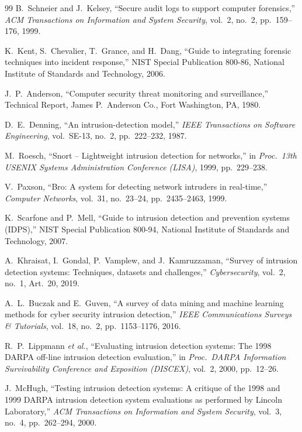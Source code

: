 \documentclass[12pt,a4paper,oneside]{article}
\begin{document}
\begin{thebibliography}{99}
 B.~Schneier and J.~Kelsey, ``Secure audit logs to support computer forensics,'' \emph{ACM Transactions on Information and System Security}, vol.~2, no.~2, pp.\ 159--176, 1999.

 K.~Kent, S.~Chevalier, T.~Grance, and H.~Dang, ``Guide to integrating forensic techniques into incident response,'' NIST Special Publication 800-86, National Institute of Standards and Technology, 2006.

 J.~P.~Anderson, ``Computer security threat monitoring and surveillance,'' Technical Report, James P.\ Anderson Co., Fort Washington, PA, 1980.

 D.~E.~Denning, ``An intrusion-detection model,'' \emph{IEEE Transactions on Software Engineering}, vol.~SE-13, no.~2, pp.\ 222--232, 1987.

 M.~Roesch, ``Snort -- Lightweight intrusion detection for networks,'' in \emph{Proc.\ 13th USENIX Systems Administration Conference (LISA)}, 1999, pp.\ 229--238.

 V.~Paxson, ``Bro: A system for detecting network intruders in real-time,'' \emph{Computer Networks}, vol.~31, no.~23--24, pp.\ 2435--2463, 1999.

 K.~Scarfone and P.~Mell, ``Guide to intrusion detection and prevention systems (IDPS),'' NIST Special Publication 800-94, National Institute of Standards and Technology, 2007.

 A.~Khraisat, I.~Gondal, P.~Vamplew, and J.~Kamruzzaman, ``Survey of intrusion detection systems: Techniques, datasets and challenges,'' \emph{Cybersecurity}, vol.~2, no.~1, Art.\ 20, 2019.

 A.~L.~Buczak and E.~Guven, ``A survey of data mining and machine learning methods for cyber security intrusion detection,'' \emph{IEEE Communications Surveys \& Tutorials}, vol.~18, no.~2, pp.\ 1153--1176, 2016.

 R.~P.~Lippmann \emph{et al.}, ``Evaluating intrusion detection systems: The 1998 DARPA off-line intrusion detection evaluation,'' in \emph{Proc.\ DARPA Information Survivability Conference and Exposition (DISCEX)}, vol.~2, 2000, pp.\ 12--26.

 J.~McHugh, ``Testing intrusion detection systems: A critique of the 1998 and 1999 DARPA intrusion detection system evaluations as performed by Lincoln Laboratory,'' \emph{ACM Transactions on Information and System Security}, vol.~3, no.~4, pp.\ 262--294, 2000.


\end{thebibliography}
\end{document}
